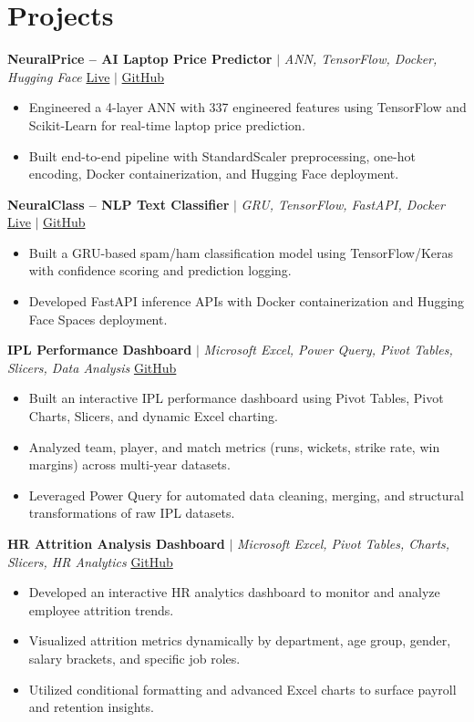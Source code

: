 \documentclass[a4paper,9pt]{article}
\newcommand{\resumeItem}[1]{\item\small #1}
\begin{document}
\vspace{-2mm}

\section{Projects}

\noindent\textbf{NeuralPrice -- AI Laptop Price Predictor} $|$ \textit{ANN, TensorFlow, Docker, Hugging Face} \hfill
\href{https://huggingface.co/spaces/Harsh0809/laptop-price-predictor-Ann}{\small Live} $|$
\href{https://github.com/hsachan295-source/Laptop-Price-Prediction-ANN}{\small GitHub}
\begin{itemize}
\resumeItem{Engineered a 4-layer ANN with 337 engineered features using TensorFlow and Scikit-Learn for real-time laptop price prediction.}
\resumeItem{Built end-to-end pipeline with StandardScaler preprocessing, one-hot encoding, Docker containerization, and Hugging Face deployment.}
\end{itemize}

\vspace{1.5pt}
\noindent\textbf{NeuralClass -- NLP Text Classifier} $|$ \textit{GRU, TensorFlow, FastAPI, Docker} \hfill
\href{https://huggingface.co/spaces/Harsh0809/gru-text-classifier}{\small Live} $|$
\href{https://github.com/hsachan295-source/Email-Spam-Detector}{\small GitHub}
\begin{itemize}
\resumeItem{Built a GRU-based spam/ham classification model using TensorFlow/Keras with confidence scoring and prediction logging.}
\resumeItem{Developed FastAPI inference APIs with Docker containerization and Hugging Face Spaces deployment.}
\end{itemize}

\vspace{1.5pt}
\noindent\textbf{IPL Performance Dashboard} $|$ \textit{Microsoft Excel, Power Query, Pivot Tables, Slicers, Data Analysis} \hfill
\href{https://github.com/hsachan295-source/Power-BI-Portfolio}{\small GitHub}
\begin{itemize}
\resumeItem{Built an interactive IPL performance dashboard using Pivot Tables, Pivot Charts, Slicers, and dynamic Excel charting.}
\resumeItem{Analyzed team, player, and match metrics (runs, wickets, strike rate, win margins) across multi-year datasets.}
\resumeItem{Leveraged Power Query for automated data cleaning, merging, and structural transformations of raw IPL datasets.}
\end{itemize}

\vspace{1.5pt}
\noindent\textbf{HR Attrition Analysis Dashboard} $|$ \textit{Microsoft Excel, Pivot Tables, Charts, Slicers, HR Analytics} \hfill
\href{https://github.com/hsachan295-source/Power-BI-Portfolio}{\small GitHub}
\begin{itemize}
\resumeItem{Developed an interactive HR analytics dashboard to monitor and analyze employee attrition trends.}
\resumeItem{Visualized attrition metrics dynamically by department, age group, gender, salary brackets, and specific job roles.}
\resumeItem{Utilized conditional formatting and advanced Excel charts to surface payroll and retention insights.}
\end{itemize}
\end{document}

